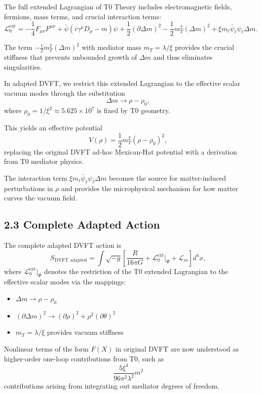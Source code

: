 \documentclass[12pt,a4paper]{article}
\begin{document}
	The full extended Lagrangian of T0 Theory includes electromagnetic fields, fermions, mass terms, and crucial interaction terms:
	\[
	\mathcal{L}_0^{\text{ext}} = -\frac{1}{4} F_{\mu\nu}F^{\mu\nu} + \bar{\psi}(i\gamma^\mu D_\mu - m)\psi + \frac{1}{2}(\partial \Delta m)^2 - \frac{1}{2} m_T^2 (\Delta m)^2 + \xi m_\ell \bar{\psi}_\ell \psi_\ell \Delta m.
	\]
	
	The term $-\frac{1}{2} m_T^2 (\Delta m)^2$ with mediator mass $m_T = \lambda / \xi$ provides the crucial stiffness that prevents unbounded growth of $\Delta m$ and thus eliminates singularities.
	
	In adapted DVFT, we restrict this extended Lagrangian to the effective scalar vacuum modes through the substitution
	\[
	\Delta m \to \rho - \rho_0,
	\]
	where $\rho_0 = 1/\xi^2 \approx 5.625 \times 10^7$ is fixed by T0 geometry.
	
	This yields an effective potential
	\[
	V(\rho) = \frac{1}{2} m_T^2 (\rho - \rho_0)^2,
	\]
	replacing the original DVFT ad-hoc Mexican-Hat potential with a derivation from T0 mediator physics.
	
	The interaction term $\xi m_\ell \bar{\psi}_\ell \psi_\ell \Delta m$ becomes the source for matter-induced perturbations in $\rho$ and provides the microphysical mechanism for how matter curves the vacuum field.
	
	\subsection{2.3 Complete Adapted Action}
	
	The complete adapted DVFT action is
	\[
	S_{\text{DVFT adapted}} = \int \sqrt{-g} \left[ \frac{R}{16\pi G} + \mathcal{L}_0^{\text{ext}} \big|_{\Phi} + \mathcal{L}_m \right] d^4x,
	\]
	where $\mathcal{L}_0^{\text{ext}} \big|_{\Phi}$ denotes the restriction of the T0 extended Lagrangian to the effective scalar modes via the mappings:
	\begin{itemize}
		\item $\Delta m \to \rho - \rho_0$
		\item $(\partial \Delta m)^2 \to (\partial \rho)^2 + \rho^2 (\partial \theta)^2$
		\item $m_T = \lambda / \xi$ provides vacuum stiffness
	\end{itemize}
	
	Nonlinear terms of the form $F(X)$ in original DVFT are now understood as higher-order one-loop contributions from T0, such as
	\[
	\frac{5\xi^4}{96\pi^2 \lambda^2} m^2
	\]
	contributions arising from integrating out mediator degrees of freedom.
	
\end{document}
